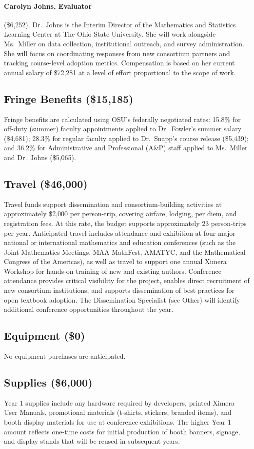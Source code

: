 \documentclass[12pt,letterpaper]{article}
\newcommand{\budgetcat}[1]{\subsection*{#1}}
\begin{document}
  \paragraph{Carolyn Johns, Evaluator} (\$6,252). Dr.\ Johns is the Interim Director of the Mathematics and Statistics Learning Center at The Ohio State University. She will work alongside Ms.\ Miller on data collection, institutional outreach, and survey administration. She will focus on coordinating responses from new consortium partners and tracking course-level adoption metrics. Compensation is based on her current annual salary of \$72,281 at a level of effort proportional to the scope of work.
% 
\budgetcat{Fringe Benefits (\$15,185)}

Fringe benefits are calculated using OSU's federally negotiated rates: 15.8\% for off-duty (summer) faculty appointments applied to Dr.\ Fowler's summer salary (\$4,681); 28.3\% for regular faculty applied to Dr.\ Snapp's course release (\$5,439); and 36.2\% for Administrative and Professional (A\&P) staff applied to Ms.\ Miller and Dr.\ Johns (\$5,065).

\budgetcat{Travel (\$46,000)}
Travel funds support dissemination and consortium-building activities at approximately \$2,000 per person-trip, covering airfare, lodging, per diem, and registration fees. At this rate, the budget supports approximately 23 person-trips per year. Anticipated travel includes attendance and exhibition at four major national or international mathematics and education conferences (such as the Joint Mathematics Meetings, MAA MathFest, AMATYC, and the Mathematical Congress of the Americas), as well as travel to support one annual Ximera Workshop for hands-on training of new and existing authors. Conference attendance provides critical visibility for the project, enables direct recruitment of new consortium institutions, and supports dissemination of best practices for open textbook adoption. The Dissemination Specialist (see Other) will identify additional conference opportunities throughout the year.


\budgetcat{Equipment (\$0)}

No equipment purchases are anticipated.

\budgetcat{Supplies (\$6,000)}

Year 1 supplies include any hardware required by developers,  printed Ximera User Manuals, promotional materials (t-shirts, stickers, branded items), and booth display materials for use at conference exhibitions. The higher Year 1 amount reflects one-time costs for initial production of booth banners, signage, and display stands that will be reused in subsequent years.
\end{document}
